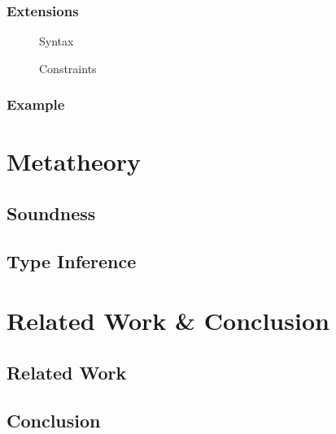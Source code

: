 \documentclass[runningheads]{llncs}
\begin{document}
\subsubsection{Extensions}
\begin{figure}[t]
  \centering
  \caption{Syntax}
\end{figure}
\begin{figure}[t]
  \centering
  \caption{Constraints}
\end{figure}
\subsubsection{Example}
\section{Metatheory}
\subsection{Soundness}
\subsection{Type Inference}
\section{Related Work \& Conclusion}
\subsection{Related Work}
\subsection{Conclusion}

\nocite{hmx}
\nocite{sts}
\nocite{atapl}
\printbibliography{}
\end{document}
